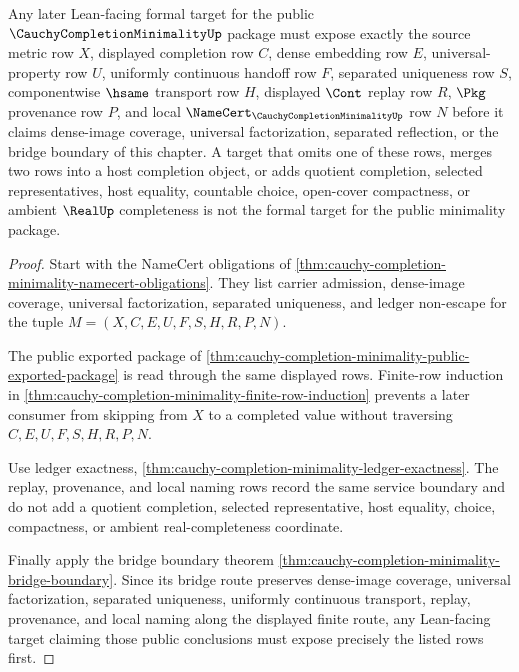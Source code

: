 \begin{theorem}
\label{thm:cauchy-completion-minimality-formal-target-contract}
Any later Lean-facing formal target for the public $\CauchyCompletionMinimalityUp$ package must expose exactly the source metric row $X$, displayed completion row $C$, dense embedding row $E$, universal-property row $U$, uniformly continuous handoff row $F$, separated uniqueness row $S$, componentwise $\hsame$ transport row $H$, displayed $\Cont$ replay row $R$, $\Pkg$ provenance row $P$, and local $\NameCert_{\CauchyCompletionMinimalityUp}$ row $N$ before it claims dense-image coverage, universal factorization, separated reflection, or the bridge boundary of this chapter. A target that omits one of these rows, merges two rows into a host completion object, or adds quotient completion, selected representatives, host equality, countable choice, open-cover compactness, or ambient $\RealUp$ completeness is not the formal target for the public minimality package.
\end{theorem}
\begin{proof}
Start with the NameCert obligations of \autoref{thm:cauchy-completion-minimality-namecert-obligations}. They list carrier admission, dense-image coverage, universal factorization, separated uniqueness, and ledger non-escape for the tuple $M=(X,C,E,U,F,S,H,R,P,N)$.

The public exported package of \autoref{thm:cauchy-completion-minimality-public-exported-package} is read through the same displayed rows. Finite-row induction in \autoref{thm:cauchy-completion-minimality-finite-row-induction} prevents a later consumer from skipping from $X$ to a completed value without traversing $C,E,U,F,S,H,R,P,N$.

Use ledger exactness, \autoref{thm:cauchy-completion-minimality-ledger-exactness}. The replay, provenance, and local naming rows record the same service boundary and do not add a quotient completion, selected representative, host equality, choice, compactness, or ambient real-completeness coordinate.

Finally apply the bridge boundary theorem \autoref{thm:cauchy-completion-minimality-bridge-boundary}. Since its bridge route preserves dense-image coverage, universal factorization, separated uniqueness, uniformly continuous transport, replay, provenance, and local naming along the displayed finite route, any Lean-facing target claiming those public conclusions must expose precisely the listed rows first.
\end{proof}

